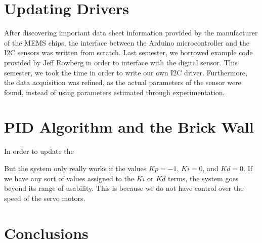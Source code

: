 \documentclass{IEEEtran}
\begin{document}
\section{Updating Drivers}
After discovering important data sheet information provided by the manufacturer of the MEMS chips, the interface between the Arduino microcontroller and the I2C sensors was written from scratch. Last semester, we borrowed example code provided by Jeff Rowberg \cite{rowberg} in order to interface with the digital sensor. This semester, we took the time in order to write our own I2C driver. Furthermore, the data acquisition was refined, as the actual parameters of the sensor were found, instead of using parameters estimated through experimentation.

\section{PID Algorithm and the Brick Wall}
In order to update the 

But the system only really works if the values $Kp = -1$, $Ki = 0$, and $Kd = 0$. If we have any sort of values assigned to the $Ki$ or $Kd$ terms, the system goes beyond its range of usability. This is because we do not have control over the speed of the servo motors.

\section{Conclusions}



\end{document}
